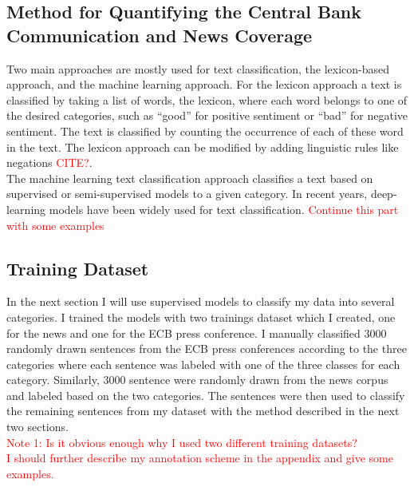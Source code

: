 \documentclass[review]{elsarticle}
\begin{document}
\subsection{Method for Quantifying the Central Bank Communication and News Coverage}

Two main approaches are mostly used for text classification, the lexicon-based approach, and the machine learning approach. For the lexicon approach a text is classified by taking a list of words, the lexicon, where each word belongs to one of the desired categories, such as “good” for positive sentiment or “bad” for negative sentiment. The text is classified by counting the occurrence of each of these word in the text. The lexicon approach can be modified by adding linguistic rules like negations \textcolor{red}{CITE?}.
\\ 
The machine learning text classification approach classifies a text based on supervised or semi-supervised models to a given category. In recent years, deep-learning models have been widely used for text classification.
\textcolor{red}{Continue this part with some examples}

\subsection{Training Dataset}
In the next section I will use supervised models to classify my data into several categories. I trained the models with two trainings dataset which I created, one for the news and one for the ECB press conference. I manually classified 3000 randomly drawn sentences from the ECB press conferences according to the three categories where each sentence was labeled with one of the three classes for each category.  Similarly, 3000 sentence were randomly drawn from the news corpus and labeled based on the two categories. The sentences were then used to classify the remaining sentences from my dataset with the method described in the next two sections.
\\
\textcolor{red}{Note 1: Is it obvious enough why I used two different training datasets?}
\\
\textcolor{red}{I should further describe my annotation scheme in the appendix and give some examples.}
\end{document}
